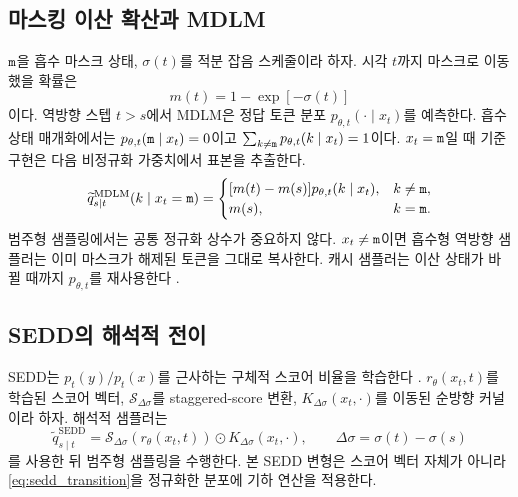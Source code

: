 \subsection{마스킹 이산 확산과 MDLM}

$\mathtt{m}$을 흡수 마스크 상태, $\sigma(t)$를 적분 잡음 스케줄이라 하자. 시각 $t$까지 마스크로
이동했을 확률은
\begin{equation}
  m(t)=1-\exp[-\sigma(t)]
\end{equation}
이다. 역방향 스텝 $t>s$에서 MDLM은 정답 토큰 분포
$p_{\theta,t}(\cdot\mid x_t)$를 예측한다. 흡수 상태 매개화에서는
$p_{\theta,t}(\mathtt{m}\mid x_t)=0$이고
$\sum_{k\ne\mathtt{m}}p_{\theta,t}(k\mid x_t)=1$이다. $x_t=\mathtt{m}$일 때 기준 구현은 다음 비정규화 가중치에서
표본을 추출한다.
\begin{equation}
  \widetilde q^{\mathrm{MDLM}}_{s\mid t}(k\mid x_t=\mathtt{m})=
  \begin{cases}
    [m(t)-m(s)]p_{\theta,t}(k\mid x_t), & k\neq\mathtt{m},\\
    m(s), & k=\mathtt{m}.
  \end{cases}
  \label{eq:mdlm_transition}
\end{equation}
범주형 샘플링에서는 공통 정규화 상수가 중요하지 않다. $x_t\neq\mathtt{m}$이면 흡수형 역방향
샘플러는 이미 마스크가 해제된 토큰을 그대로 복사한다. 캐시 샘플러는 이산 상태가 바뀔 때까지
$p_{\theta,t}$를 재사용한다 \citep{sahoo2024mdlm}.

\subsection{SEDD의 해석적 전이}

SEDD는 $p_t(y)/p_t(x)$를 근사하는 구체적 스코어 비율을 학습한다 \citep{lou2024sedd}.
$r_\theta(x_t,t)$를 학습된 스코어 벡터, $\mathcal{S}_{\Delta\sigma}$를 staggered-score 변환,
$K_{\Delta\sigma}(x_t,\cdot)$를 이동된 순방향 커널이라 하자. 해석적 샘플러는
\begin{equation}
  \widetilde q^{\mathrm{SEDD}}_{s\mid t}
  =\mathcal{S}_{\Delta\sigma}\!\left(r_\theta(x_t,t)\right)
   \odot K_{\Delta\sigma}(x_t,\cdot),
  \qquad
  \Delta\sigma=\sigma(t)-\sigma(s)
  \label{eq:sedd_transition}
\end{equation}
를 사용한 뒤 범주형 샘플링을 수행한다. 본 SEDD 변형은 스코어 벡터 자체가 아니라
\cref{eq:sedd_transition}을 정규화한 분포에 기하 연산을 적용한다.
